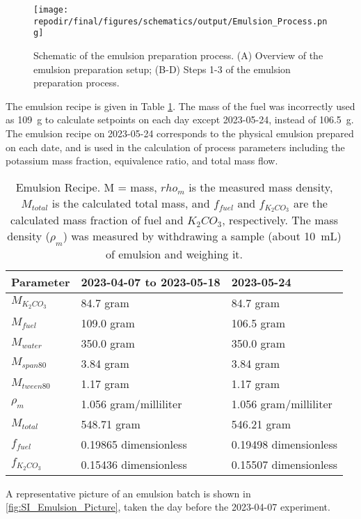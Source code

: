 \begin{figure}[]
\centering
\texttt{[image: \\repodir/final/figures/schematics/output/Emulsion\_Process.png]}
\caption{Schematic of the emulsion preparation process. (A) Overview of the emulsion preparation setup; (B-D) Steps 1-3 of the emulsion preparation process.}
\label{fig:SI_Emulsion_Process}
\end{figure}


The emulsion recipe is given in Table \ref{tab:emulsion_parameters}. The mass of the fuel was incorrectly used as \SI{109} {g} to calculate setpoints on each day except 2023-05-24, instead of \SI{106.5} {g}. The emulsion recipe on 2023-05-24 corresponds to the physical emulsion prepared on each date, and is used in the calculation of process parameters including the potassium mass fraction, equivalence ratio, and total mass flow. 


\begin{table}[h]
\centering
\begin{tabular}{|l|l|l|}
\hline
\textbf{Parameter} & \textbf{2023-04-07 to 2023-05-18} & \textbf{2023-05-24} \\
\hline
$M_{K_2CO_3}$ & 84.7 gram & 84.7 gram \\
$M_{fuel}$ & 109.0 gram & 106.5 gram \\
$M_{water}$ & 350.0 gram & 350.0 gram \\
$M_{span80}$ & 3.84 gram & 3.84 gram \\
$M_{tween80}$ & 1.17 gram & 1.17 gram \\
$\rho_m$ & 1.056 gram/milliliter & 1.056 gram/milliliter \\
$M_{total}$ & 548.71 gram & 546.21 gram \\
$f_{fuel}$ & 0.19865 dimensionless & 0.19498 dimensionless \\
$f_{K_2CO_3}$ & 0.15436 dimensionless & 0.15507 dimensionless \\
\hline
\end{tabular}
\caption{Emulsion Recipe. M = mass, $rho_m$ is the measured mass density, $M_{total}$ is the calculated total mass, and $f_{fuel}$ and $f_{K_2CO_3}$ are the calculated mass fraction of fuel and $K_2CO_3$, respectively. The mass density ($\rho_m$) was measured by withdrawing a sample (about \SI{10} {mL}) of emulsion and weighing it.  }


\label{tab:emulsion_parameters}
\end{table}
A representative picture of an emulsion batch is shown in \ref{fig:SI_Emulsion_Picture}, taken the day before the 2023-04-07 experiment. 

